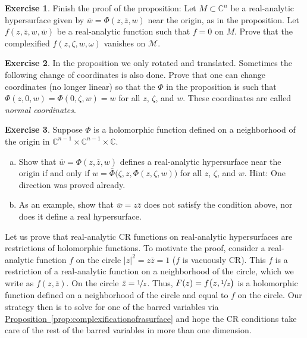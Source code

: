 \documentclass[12pt,openany]{book}
\newcommand{\sabs}[1]{\lvert {#1} \rvert}
\newcommand{\C}{{\mathbb{C}}}
\newcommand{\sM}{{\mathscr{M}}}
\newcommand{\myindex}[1]{#1\index{#1}}
\theoremstyle{plain}
\theoremstyle{remark}
\theoremstyle{definition}
\newenvironment{exbox}{%
    \def\FrameCommand{\vrule width 1pt \relax\hspace{10pt}}%
    \MakeFramed{\advance\hsize-\width\FrameRestore}%
}{%
    \endMakeFramed
}
\newenvironment{exparts}{%
    \leavevmode\begin{enumerate}[a),noitemsep,topsep=0pt,parsep=0pt,partopsep=0pt]
}{%
    \end{enumerate}
}
\theoremstyle{exercise}
\newtheorem{exercise}{Exercise}[section]
\theoremstyle{example}
\newcommand{\propref}[1]{\hyperref[#1]{Proposition~\ref*{#1}}}
\begin{document}
\begin{exbox}
\begin{exercise}
Finish the proof of the proposition:
Let $M\subset \C^n$ be a real-analytic hypersurface given by
$\bar{w} = \Phi(z,\bar{z},w)$ near the origin, as in the proposition.  Let
$f(z,\bar{z},w,\bar{w})$ be a real-analytic function such that $f=0$
on $M$.  Prove that the complexified $f(z,\zeta,w,\omega)$ vanishes on
$\sM$.
\end{exercise}

\begin{exercise}
In the proposition we only rotated and translated.  Sometimes the following
change of coordinates is also done.  Prove that one can change coordinates
(no longer linear) so that the $\Phi$ in the proposition is
such that $\Phi(z,0,w) = \Phi(0,\zeta,w) = w$ for all $z$, $\zeta$, and $w$.
These coordinates are called \emph{\myindex{normal coordinates}}.
\end{exercise}

\begin{exercise}
Suppose
$\Phi$ is a holomorphic function defined on a neighborhood of the origin
in $\C^{n-1} \times \C^{n-1} \times \C$.
\begin{exparts}
\item
Show that $\bar{w} = \Phi(z,\bar{z},w)$ defines a real-analytic hypersurface
near the origin if and only if
$w = \bar{\Phi}\bigl(\zeta,z,\Phi(z,\zeta,w)\bigr)$
for all $z$, $\zeta$, and $w$.  Hint: One direction was proved already.
\item
As an example, show that $\bar{w} = z\bar{z}$ does not satisfy the
condition above, nor does it define a real hypersurface.
\end{exparts}
\end{exercise}
\end{exbox}

Let us prove that real-analytic CR functions on real-analytic
hypersurfaces are restrictions
of holomorphic functions.  To motivate the proof, consider
a real-analytic function $f$ on the circle $\sabs{z}^2 = z \bar{z} = 1$
($f$ is vacuously CR).  This $f$
is a restriction of a real-analytic function on a
neighborhood of the circle, which we write as $f(z,\bar{z})$.
On the circle
$\bar{z} = \nicefrac{1}{z}$.  Thus,
$F(z) = f\bigl(z,\nicefrac{1}{z}\bigr)$ is a holomorphic function
defined on a neighborhood of the circle and
equal to $f$ on the circle.
Our strategy then is to solve for one of the barred variables via
\propref{prop:complexificationofrasurface} and hope
the CR conditions take care of the rest of the barred variables
in more than one dimension.
\end{document}
